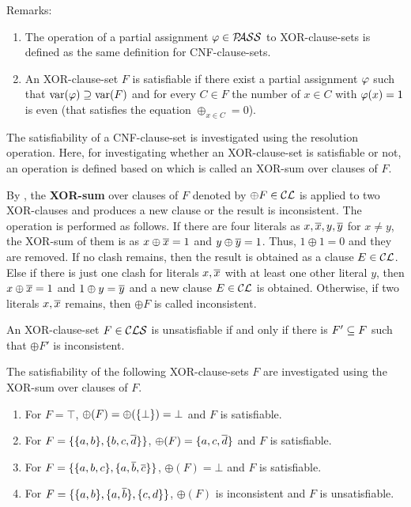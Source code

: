 \documentclass{report}
\begin{document}
Remarks:
\begin{enumerate}
  \item The operation of a partial assignment $\varphi \in \mathcal{P\hspace{-0.32em}ASS}$ to XOR-clause-sets is defined as the same definition for CNF-clause-sets.
  \item An XOR-clause-set $F$ is satisfiable if there exist a partial assignment $\varphi$ such that $\operatorname{var}(\varphi) \supseteq \operatorname{var}(F)$ and for every $C \in F$ the number of $x \in C$ with $\varphi(x) = 1$ is even (that satisfies the equation  $\oplus_{x \in C} = 0$).
\end{enumerate}

The satisfiability of a CNF-clause-set is investigated using the resolution operation. Here, for investigating whether an XOR-clause-set is satisfiable or not, an operation is defined based on \cite{GwynneKullmann2013GoodRepresentationsIIex,GwynneKullmann2013GoodRepresentationsIILata} which is called an XOR-sum over clauses of $F$.

\begin{defi}\label{def:xor-sum}
By \cite{GwynneKullmann2013GoodRepresentationsIIex}, the \textbf{XOR-sum} over clauses of $F$ denoted by $\oplus F \in \mathcal{CL}$ is applied to two XOR-clauses and produces a new clause or the result is inconsistent. The operation is performed as follows. If there are four literals as $x,\overline{x},y,\overline{y}$ for $x \ne y$, the XOR-sum of them is as $x \oplus \overline{x} = 1$ and $y \oplus \overline{y} = 1$. Thus, $1 \oplus 1 = 0$ and they are removed. If no clash remains, then the result is obtained as a clause $E \in \mathcal{CL}$. Else if there is just one clash for literals $x, \overline{x}$ with at least one other literal $y$, then $x \oplus \overline{x} = 1$ and $1 \oplus y=\overline{y}$ and a new clause $E \in \mathcal{CL}$ is obtained. Otherwise, if two literals $x, \overline{x}$ remains, then $\oplus F$ is called inconsistent. 

An XOR-clause-set $F \in \mathcal{CLS}$ is unsatisfiable if and only if there is $F' \subseteq F$ such that $\oplus F'$ is inconsistent.
\end{defi} 

\begin{examp}\label{exp:xorcls}
The satisfiability of the following XOR-clause-sets $F$ are investigated using the XOR-sum over clauses of $F$.
  \begin{enumerate}
  \item For $F=\top$, $ \oplus(F)= \oplus(\{ \bot \})=\bot$ and $F$ is satisfiable.
  \item For $F=\{ \{ a,b \},\{ b,c,\overline d \} \}$, $ \oplus(F) = \{ a,c,\overline d \}$ and $F$ is satisfiable.
  \item For $F=\{ \{ a,b,c \},\{ a, \overline b, \overline c \} \}$, $ \oplus(F) = \bot$ and $F$ is satisfiable.  
  \item  For $F=\{ \{ a,b \},\{ a, \overline b \},\{ c,d \} \}$, $\oplus (F)$ is inconsistent and $F$ is unsatisfiable.
  \end{enumerate}
\end{examp}
\end{document}
